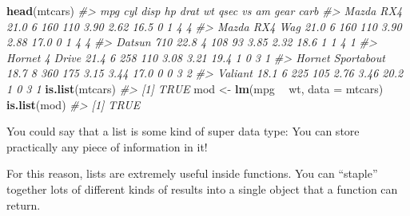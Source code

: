\documentclass[]{book}
\newenvironment{Shaded}{\begin{snugshade}}{\end{snugshade}}
\newcommand{\KeywordTok}[1]{\textcolor[rgb]{0.13,0.29,0.53}{\textbf{#1}}}
\newcommand{\DataTypeTok}[1]{\textcolor[rgb]{0.13,0.29,0.53}{#1}}
\newcommand{\StringTok}[1]{\textcolor[rgb]{0.31,0.60,0.02}{#1}}
\newcommand{\CommentTok}[1]{\textcolor[rgb]{0.56,0.35,0.01}{\textit{#1}}}
\newcommand{\OperatorTok}[1]{\textcolor[rgb]{0.81,0.36,0.00}{\textbf{#1}}}
\newcommand{\NormalTok}[1]{#1}
\begin{document}
\begin{Shaded}
\begin{Highlighting}[]
\KeywordTok{head}\NormalTok{(mtcars)}
\CommentTok{#>                    mpg cyl disp  hp drat   wt qsec vs am gear carb}
\CommentTok{#> Mazda RX4         21.0   6  160 110 3.90 2.62 16.5  0  1    4    4}
\CommentTok{#> Mazda RX4 Wag     21.0   6  160 110 3.90 2.88 17.0  0  1    4    4}
\CommentTok{#> Datsun 710        22.8   4  108  93 3.85 2.32 18.6  1  1    4    1}
\CommentTok{#> Hornet 4 Drive    21.4   6  258 110 3.08 3.21 19.4  1  0    3    1}
\CommentTok{#> Hornet Sportabout 18.7   8  360 175 3.15 3.44 17.0  0  0    3    2}
\CommentTok{#> Valiant           18.1   6  225 105 2.76 3.46 20.2  1  0    3    1}
\KeywordTok{is.list}\NormalTok{(mtcars)}
\CommentTok{#> [1] TRUE}
\NormalTok{mod <-}\StringTok{ }\KeywordTok{lm}\NormalTok{(mpg }\OperatorTok{~}\StringTok{ }\NormalTok{wt, }\DataTypeTok{data =}\NormalTok{ mtcars)}
\KeywordTok{is.list}\NormalTok{(mod)}
\CommentTok{#> [1] TRUE}
\end{Highlighting}
\end{Shaded}

You could say that a list is some kind of super data type: You can store
practically any piece of information in it!

For this reason, lists are extremely useful inside functions. You can
``staple'' together lots of different kinds of results into a single
object that a function can return.
\end{document}
